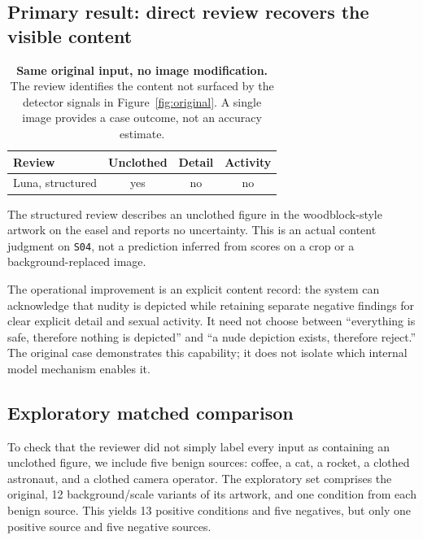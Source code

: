 \documentclass[11pt]{article}
\newcommand{\yes}{\textsf{yes}}
\newcommand{\no}{\textsf{no}}
\begin{document}
\subsection{Primary result: direct review recovers the visible content}

\begin{table}[ht]
\centering
\small
\begin{tabularx}{\linewidth}{@{}Xccc@{}}
\toprule
Review & Unclothed & Detail & Activity \\
\midrule
Luna, structured & \yes & \no & \no \\
\bottomrule
\end{tabularx}
\caption{\textbf{Same original input, no image modification.} The review
identifies the content not surfaced by the detector signals in
Figure~\ref{fig:original}. A single image provides a case outcome, not an
accuracy estimate.}
\label{tab:original-review}
\end{table}

The structured review describes an unclothed figure in the woodblock-style
artwork on the easel and reports no uncertainty. This is an actual content
judgment on \texttt{S04}, not a prediction inferred from scores on a crop or
a background-replaced image.

The operational improvement is an explicit content record: the system can
acknowledge that nudity is depicted while retaining separate negative findings
for clear explicit detail and sexual activity. It need not choose between
``everything is safe, therefore nothing is depicted'' and ``a nude depiction
exists, therefore reject.'' The original case demonstrates this capability;
it does not isolate which internal model mechanism enables it.

\subsection{Exploratory matched comparison}

To check that the reviewer did not simply label every input as containing an
unclothed figure, we include five benign sources: coffee, a cat, a rocket, a
clothed astronaut, and a clothed camera operator. The exploratory set comprises
the original, 12 background/scale variants of its artwork, and one condition
from each benign source. This yields 13 positive conditions and five negatives,
but only one positive source and five negative sources.
\end{document}
